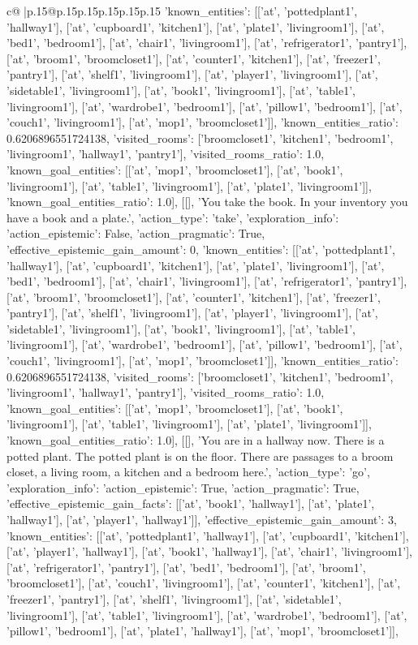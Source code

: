 \documentclass{article}
\begin{document}
{\begin{supertabular}{c@{$\;$}|p{.15\linewidth}@{}p{.15\linewidth}p{.15\linewidth}p{.15\linewidth}p{.15\linewidth}p{.15\linewidth}}
{{{'known_entities': [['at', 'pottedplant1', 'hallway1'], ['at', 'cupboard1', 'kitchen1'], ['at', 'plate1', 'livingroom1'], ['at', 'bed1', 'bedroom1'], ['at', 'chair1', 'livingroom1'], ['at', 'refrigerator1', 'pantry1'], ['at', 'broom1', 'broomcloset1'], ['at', 'counter1', 'kitchen1'], ['at', 'freezer1', 'pantry1'], ['at', 'shelf1', 'livingroom1'], ['at', 'player1', 'livingroom1'], ['at', 'sidetable1', 'livingroom1'], ['at', 'book1', 'livingroom1'], ['at', 'table1', 'livingroom1'], ['at', 'wardrobe1', 'bedroom1'], ['at', 'pillow1', 'bedroom1'], ['at', 'couch1', 'livingroom1'], ['at', 'mop1', 'broomcloset1']], 'known_entities_ratio': 0.6206896551724138, 'visited_rooms': ['broomcloset1', 'kitchen1', 'bedroom1', 'livingroom1', 'hallway1', 'pantry1'], 'visited_rooms_ratio': 1.0, 'known_goal_entities': [['at', 'mop1', 'broomcloset1'], ['at', 'book1', 'livingroom1'], ['at', 'table1', 'livingroom1'], ['at', 'plate1', 'livingroom1']], 'known_goal_entities_ratio': 1.0}}], [[], 'You take the book. In your inventory you have a book and a plate.', {'action_type': 'take', 'exploration_info': {'action_epistemic': False, 'action_pragmatic': True, 'effective_epistemic_gain_amount': 0, 'known_entities': [['at', 'pottedplant1', 'hallway1'], ['at', 'cupboard1', 'kitchen1'], ['at', 'plate1', 'livingroom1'], ['at', 'bed1', 'bedroom1'], ['at', 'chair1', 'livingroom1'], ['at', 'refrigerator1', 'pantry1'], ['at', 'broom1', 'broomcloset1'], ['at', 'counter1', 'kitchen1'], ['at', 'freezer1', 'pantry1'], ['at', 'shelf1', 'livingroom1'], ['at', 'player1', 'livingroom1'], ['at', 'sidetable1', 'livingroom1'], ['at', 'book1', 'livingroom1'], ['at', 'table1', 'livingroom1'], ['at', 'wardrobe1', 'bedroom1'], ['at', 'pillow1', 'bedroom1'], ['at', 'couch1', 'livingroom1'], ['at', 'mop1', 'broomcloset1']], 'known_entities_ratio': 0.6206896551724138, 'visited_rooms': ['broomcloset1', 'kitchen1', 'bedroom1', 'livingroom1', 'hallway1', 'pantry1'], 'visited_rooms_ratio': 1.0, 'known_goal_entities': [['at', 'mop1', 'broomcloset1'], ['at', 'book1', 'livingroom1'], ['at', 'table1', 'livingroom1'], ['at', 'plate1', 'livingroom1']], 'known_goal_entities_ratio': 1.0}}], [[], 'You are in a hallway now. There is a potted plant. The potted plant is on the floor. There are passages to a broom closet, a living room, a kitchen and a bedroom here.', {'action_type': 'go', 'exploration_info': {'action_epistemic': True, 'action_pragmatic': True, 'effective_epistemic_gain_facts': [['at', 'book1', 'hallway1'], ['at', 'plate1', 'hallway1'], ['at', 'player1', 'hallway1']], 'effective_epistemic_gain_amount': 3, 'known_entities': [['at', 'pottedplant1', 'hallway1'], ['at', 'cupboard1', 'kitchen1'], ['at', 'player1', 'hallway1'], ['at', 'book1', 'hallway1'], ['at', 'chair1', 'livingroom1'], ['at', 'refrigerator1', 'pantry1'], ['at', 'bed1', 'bedroom1'], ['at', 'broom1', 'broomcloset1'], ['at', 'couch1', 'livingroom1'], ['at', 'counter1', 'kitchen1'], ['at', 'freezer1', 'pantry1'], ['at', 'shelf1', 'livingroom1'], ['at', 'sidetable1', 'livingroom1'], ['at', 'table1', 'livingroom1'], ['at', 'wardrobe1', 'bedroom1'], ['at', 'pillow1', 'bedroom1'], ['at', 'plate1', 'hallway1'], ['at', 'mop1', 'broomcloset1']], }}}
\end{supertabular}}
\end{document}
